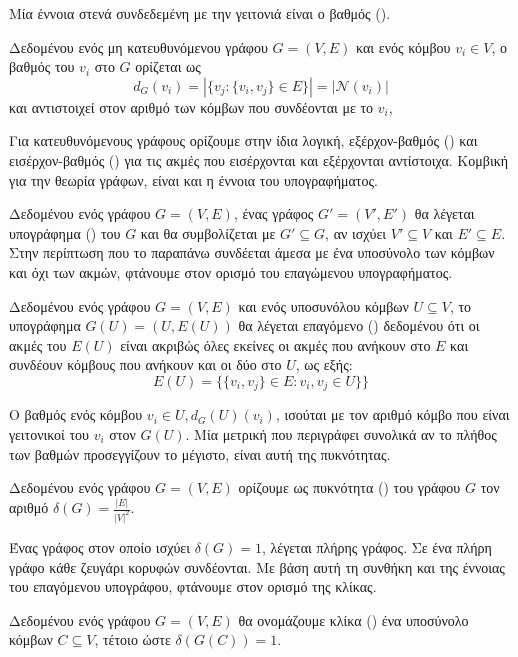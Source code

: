 Μία έννοια στενά συνδεδεμένη με την γειτονιά είναι ο βαθμός ().
\begin{definition}[Βαθμός]
Δεδομένου ενός μη κατευθυνόμενου γράφου $G = ( V, E )$ και ενός κόμβου $v_{i} \in V$, ο βαθμός του $v_{i}$ στο $G$ ορίζεται ως $$d_{G} ( v_{i} ) = |\{ v_{j} : \{ v_{i} , v_{j} \} \in E \}| = |\mathcal{N} ( v_{i} )|$$ και αντιστοιχεί στον αριθμό των κόμβων που συνδέονται με το $v_{i}$,
\end{definition}
Για κατευθυνόμενους γράφους ορίζουμε στην ίδια λογική, εξέρχον-βαθμός () και εισέρχον-βαθμός () για τις ακμές που εισέρχονται και εξέρχονται αντίστοιχα.
Κομβική για την θεωρία γράφων, είναι και η έννοια του υπογραφήματος.
\begin{definition}[Υπογράφημα]
Δεδομένου ενός γράφου $G = ( V, E )$, ένας γράφος $G' = ( V', E')$ θα λέγεται υπογράφημα () του $G$ και θα συμβολίζεται με $G' \subseteq G$, αν ισχύει $V' \subseteq V$ και $E' \subseteq E$.
\label{def:subgraph}
Στην περίπτωση που το παραπάνω συνδέεται άμεσα με ένα υποσύνολο των κόμβων και όχι των ακμών, φτάνουμε στον ορισμό του επαγώμενου υπογραφήματος.
\end{definition}
\begin{definition}
Δεδομένου ενός γράφου $G = ( V, E )$ και ενός υποσυνόλου κόμβων $U \subseteq V$, το υπογράφημα $G(U) = (U, E(U))$ θα λέγεται επαγόμενο () δεδομένου ότι οι ακμές του $E(U)$ είναι ακριβώς όλες εκείνες οι ακμές που ανήκουν στο $E$ και συνδέουν κόμβους που ανήκουν και οι δύο στο $U$, ως εξής:
\begin{equation}
    E(U) = \{\{v_{i},v_{j}\}\in E: v_{i}, v_{j}\in U\}\}
\end{equation}
\label{def:induced_subgraph}
\end{definition}
Ο βαθμός ενός κόμβου $v_{i} \in U, d_{G}(U)(v_{i})$, ισούται με τον αριθμό κόμβο που είναι γειτονικοί του $v_{i}$ στον $G(U)$.
Μία μετρική που περιγράφει συνολικά αν το πλήθος των βαθμών προσεγγίζουν το μέγιστο, είναι αυτή της πυκνότητας.
\begin{definition}[Πυκνότητα]
Δεδομένου ενός γράφου $G = ( V, E )$ ορίζουμε ως πυκνότητα () του γράφου $G$ τον αριθμό $\delta(G) = \frac{|E|}{|V|^{2}}$.
\end{definition}
Ένας γράφος στον οποίο ισχύει $\delta(G) = 1$, λέγεται πλήρης γράφος.
Σε ένα πλήρη γράφο κάθε ζευγάρι κορυφών συνδέονται.
Με βάση αυτή τη συνθήκη και της έννοιας του επαγόμενου υπογράφου, φτάνουμε στον ορισμό της κλίκας.
\begin{definition}[Κλίκα]
Δεδομένου ενός γράφου $G = ( V, E )$ θα ονομάζουμε κλίκα () ένα υποσύνολο κόμβων $C \subseteq V$, τέτοιο ώστε $\delta(G(C)) = 1$.
\end{definition}
